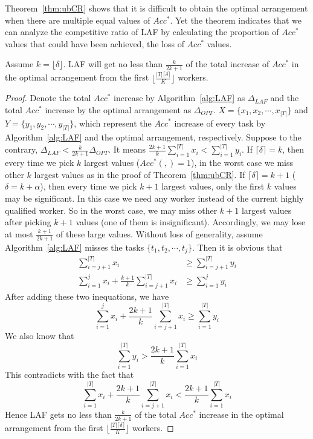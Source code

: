 Theorem~\ref{thm:ubCR} shows that it is difficult to obtain the optimal arrangement when there are multiple equal values of $Acc^{*}$.
Yet the theorem indicates that we can analyze the competitive ratio of LAF by calculating the proportion of $Acc^{*}$ values that could have been achieved, \ie the loss of $Acc^{*}$ values.

\begin{lemma}
\label{lem:lossOfLAF}
Assume $k = \lfloor \delta \rfloor$.
LAF will get no less than $\frac{k}{2k+1}$ of the total increase of $Acc^{*}$ in the optimal arrangement from the first $\lfloor \frac{|T|\lceil \delta \rceil}{K} \rfloor$ workers.
\end{lemma}
\begin{proof}
Denote the total $Acc^{*}$ increase by Algorithm~\ref{alg:LAF} as $\Delta_{LAF}$ and the total $Acc^{*}$ increase by the optimal arrangement as $\Delta_{OPT}$.
$X = \{x_1, x_2, \cdots, x_{|T|}\}$ and $Y = \{y_1, y_2, \cdots, y_{|T|}\}$, which represent the $Acc^{*}$ increase of every task by Algorithm~\ref{alg:LAF} and the optimal arrangement, respectively.
Suppose to the contrary, $\Delta_{LAF} < \frac{k}{2k+1} \Delta_{OPT}$.
It means $\frac{2k+1}{k} \sum_{i=1}^{|T|} {x_i} < \sum_{i=1}^{|T|} {y_i}$.
If $\lceil \delta \rceil = k$, then every time we pick $k$ largest values (\eg $Acc^{*}(,) = 1$), in the worst case we miss other $k$ largest values as in the proof of Theorem~\ref{thm:ubCR}.
If $\lceil \delta \rceil = k + 1$ (\eg $\delta = k + \alpha$), then every time we pick $k+1$ largest values, only the first $k$ values may be significant.
In this case we need any worker instead of the current highly qualified worker.
So in the worst case, we may miss other $k+1$ largest values after picking $k+1$ values (one of them is insignificant).
Accordingly, we may lose at most $\frac{k+1}{2k+1}$ of these large values.
Without loss of generality, assume Algorithm~\ref{alg:LAF} misses the tasks $\{t_1, t_2, \cdots, t_j\}$.
Then it is obvious that
\begin{align*}
	\sum_{i=j+1}^{|T|}{x_i} &\ge \sum_{i=j+1}^{|T|}{y_i} \\
	\sum_{i=1}^{j}{x_i} + \frac{k+1}{k} \sum_{i=j+1}^{|T|}{x_i} &\ge \sum_{i=1}^{j}{y_i}
\end{align*}
After adding these two inequations, we have
\[
	\sum_{i=1}^{j}{x_i} + \frac{2k+1}{k} \sum_{i=j+1}^{|T|}{x_i} \ge \sum_{i=1}^{|T|}{y_i}
\]
We also know that
\[
	\sum_{i=1}^{|T|} {y_i} > \frac{2k+1}{k} \sum_{i=1}^{|T|} {x_i}
\]
This contradicts with the fact that
\[
	\sum_{i=1}^{|T|}{x_i} + \frac{2k+1}{k} \sum_{i=j+1}^{|T|}{x_i} < \frac{2k+1}{k} \sum_{i=1}^{|T|} {x_i}
\]
Hence LAF gets no less than $\frac{k}{2k+1}$ of the total $Acc^{*}$ increase in the optimal arrangement from the first $\lfloor \frac{|T|\lceil \delta \rceil}{K} \rfloor$ workers.
\end{proof}

